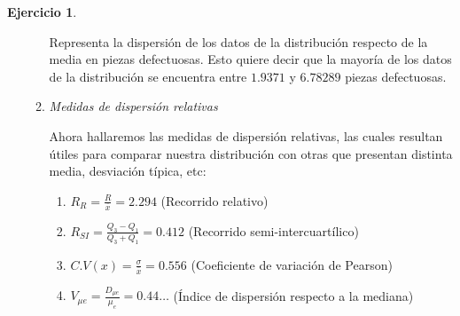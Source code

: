\documentclass[a4paper, 12pt]{article}
\theoremstyle{definition}
\newtheorem{ej}{Ejercicio}
\begin{document}
\begin{ej}
\begin{enumerate}[label=\textit{\alph*)}]
\begin{enumerate}[label=\arabic*)]
        Representa la dispersión de los datos de la distribución respecto de la media en piezas defectuosas. Esto quiere decir que la mayoría de los datos de la distribución se encuentra entre \(1.9371\) y \(6.78289\) piezas defectuosas.
        
        \item \textit{Medidas de dispersión relativas}
        
        Ahora hallaremos las medidas de dispersión relativas, las cuales resultan útiles para comparar nuestra distribución con otras que presentan distinta media, desviación típica, etc:
        
        \begin{enumerate}[label=]
            \item \(R_R = \frac{R}{\overline{x}} = 2.294\) (Recorrido relativo)
            \item \(R_{SI} = \frac{Q_3 - Q_1}{Q_3 + Q_1} = 0.412\) (Recorrido semi-intercuartílico)
            \item \(C.V(x) = \frac{\sigma}{\overline{x}} = 0.556\) (Coeficiente de variación de Pearson)
            \item \(V_{\mu e} = \frac{D_{\mu e}}{\mu_e} = 0.44\dotsc\) (Índice de dispersión respecto a la mediana)
        \end{enumerate}
    \end{enumerate}
\end{enumerate}

\end{ej} 
\end{document}
